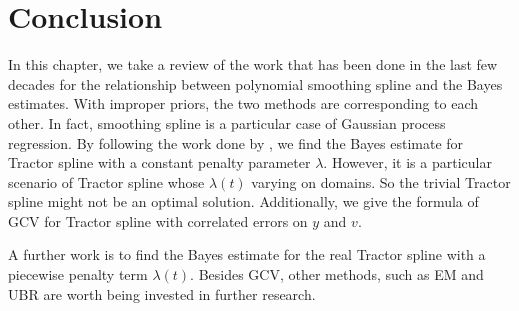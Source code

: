 \section{Conclusion}

In this chapter, we take a review of the work that has been done in the last few decades for the relationship between polynomial smoothing spline and the Bayes estimates. With improper priors, the two methods are corresponding to each other. In fact, smoothing spline is a particular case of Gaussian process regression. By following the work done by \cite{gu2013smoothing}, we find the Bayes estimate for Tractor spline with a constant penalty parameter $\lambda$.  However, it is a particular scenario of Tractor spline whose $\lambda(t)$ varying on domains. So the trivial Tractor spline might not be an optimal solution. Additionally, we give the formula of GCV for Tractor spline with correlated errors on $y$ and $v$. 


A further work is to find the Bayes estimate for the real Tractor spline with a piecewise penalty term $\lambda(t)$. Besides GCV, other methods, such as EM and UBR are worth being invested in further research. 








